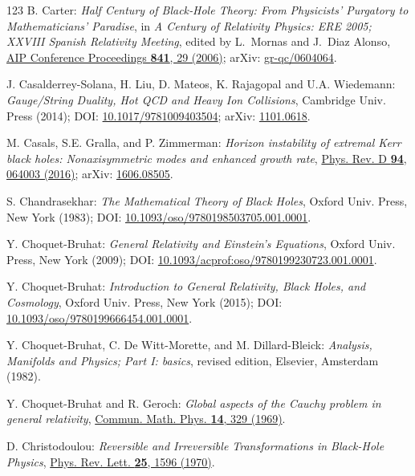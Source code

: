 \begin{thebibliography}{123}
B. Carter:
{\em Half Century of Black‐Hole Theory: From Physicists' Purgatory to Mathematicians' Paradise},
in {\em A Century of Relativity Physics: ERE 2005; XXVIII Spanish Relativity Meeting},
edited by L.~Mornas and J.~Diaz Alonso,
\href{https://doi.org/10.1063/1.2218167}{AIP Conference Proceedings {\bf 841}, 29 (2006)};
arXiv: \href{https://arxiv.org/abs/gr-qc/0604064}{gr-qc/0604064}.

J. Casalderrey-Solana, H. Liu, D. Mateos, K. Rajagopal and U.A. Wiedemann:
{\em Gauge/String Duality, Hot QCD and Heavy Ion Collisions},
Cambridge Univ. Press (2014);
DOI: \href{https://doi.org/10.1017/9781009403504}{10.1017/9781009403504};
arXiv: \href{https://arxiv.org/abs/1101.0618}{1101.0618}.

M. Casals, S.E. Gralla, and P. Zimmerman:
{\em Horizon instability of extremal Kerr black holes: Nonaxisymmetric modes and enhanced growth rate},
\href{https://doi.org/10.1103/PhysRevD.94.064003}{Phys. Rev. D {\bf 94}, 064003 (2016)};
arXiv: \href{https://arxiv.org/abs/1606.08505}{1606.08505}.

S. Chandrasekhar: {\em The Mathematical Theory of Black Holes},
Oxford Univ. Press, New York (1983);
DOI: \href{https://doi.org/10.1093/oso/9780198503705.001.0001}{10.1093/oso/9780198503705.001.0001}.

Y. Choquet-Bruhat: {\em General Relativity and Einstein's Equations},
Oxford Univ. Press, New York (2009);
DOI: \href{https://doi.org/10.1093/acprof:oso/9780199230723.001.0001}{10.1093/acprof:oso/9780199230723.001.0001}.

Y. Choquet-Bruhat: {\em Introduction to General Relativity, Black Holes, and
Cosmology}, Oxford Univ. Press, New York (2015);
DOI: \href{https://doi.org/10.1093/oso/9780199666454.001.0001}{10.1093/oso/9780199666454.001.0001}.

Y. Choquet-Bruhat, C. De Witt-Morette, and M. Dillard-Bleick:
{\em Analysis, Manifolds and Physics; Part I: basics}, revised edition,
Elsevier, Amsterdam (1982).

Y. Choquet-Bruhat and R. Geroch:
{\em Global aspects of the Cauchy problem in general relativity},
\href{https://doi.org/10.1007/BF01645389}{Commun. Math. Phys. {\bf 14}, 329 (1969)}.

D. Christodoulou:
{\em Reversible and Irreversible Transformations in Black-Hole Physics},
\href{https://doi.org/10.1103/PhysRevLett.25.1596}{Phys. Rev. Lett. {\bf 25}, 1596 (1970)}.


\end{thebibliography}
